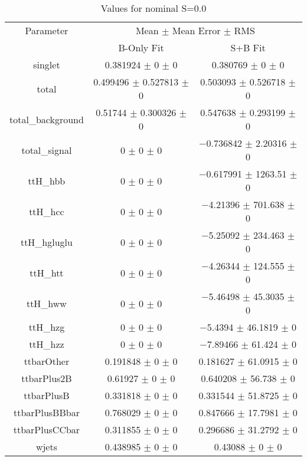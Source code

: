 \begin{table}
\centering
\caption{Values for nominal S=0.0}
\begin{tabular}{ccc}
\toprule
Parameter & \multicolumn{2}{c}{Mean $\pm$ Mean Error $\pm$ RMS}\\
 & B-Only Fit & S+B Fit\\
\midrule
singlet & \num{0.381924} $\pm$ \num{0} $\pm$ \num{0} & \num{0.380769} $\pm$ \num{0} $\pm$ \num{0}\\
total & \num{0.499496} $\pm$ \num{0.527813} $\pm$ \num{0} & \num{0.503093} $\pm$ \num{0.526718} $\pm$ \num{0}\\
total\_background & \num{0.51744} $\pm$ \num{0.300326} $\pm$ \num{0} & \num{0.547638} $\pm$ \num{0.293199} $\pm$ \num{0}\\
total\_signal & \num{0} $\pm$ \num{0} $\pm$ \num{0} & \num{-0.736842} $\pm$ \num{2.20316} $\pm$ \num{0}\\
ttH\_hbb & \num{0} $\pm$ \num{0} $\pm$ \num{0} & \num{-0.617991} $\pm$ \num{1263.51} $\pm$ \num{0}\\
ttH\_hcc & \num{0} $\pm$ \num{0} $\pm$ \num{0} & \num{-4.21396} $\pm$ \num{701.638} $\pm$ \num{0}\\
ttH\_hgluglu & \num{0} $\pm$ \num{0} $\pm$ \num{0} & \num{-5.25092} $\pm$ \num{234.463} $\pm$ \num{0}\\
ttH\_htt & \num{0} $\pm$ \num{0} $\pm$ \num{0} & \num{-4.26344} $\pm$ \num{124.555} $\pm$ \num{0}\\
ttH\_hww & \num{0} $\pm$ \num{0} $\pm$ \num{0} & \num{-5.46498} $\pm$ \num{45.3035} $\pm$ \num{0}\\
ttH\_hzg & \num{0} $\pm$ \num{0} $\pm$ \num{0} & \num{-5.4394} $\pm$ \num{46.1819} $\pm$ \num{0}\\
ttH\_hzz & \num{0} $\pm$ \num{0} $\pm$ \num{0} & \num{-7.89466} $\pm$ \num{61.424} $\pm$ \num{0}\\
ttbarOther & \num{0.191848} $\pm$ \num{0} $\pm$ \num{0} & \num{0.181627} $\pm$ \num{61.0915} $\pm$ \num{0}\\
ttbarPlus2B & \num{0.61927} $\pm$ \num{0} $\pm$ \num{0} & \num{0.640208} $\pm$ \num{56.738} $\pm$ \num{0}\\
ttbarPlusB & \num{0.331818} $\pm$ \num{0} $\pm$ \num{0} & \num{0.331544} $\pm$ \num{51.8725} $\pm$ \num{0}\\
ttbarPlusBBbar & \num{0.768029} $\pm$ \num{0} $\pm$ \num{0} & \num{0.847666} $\pm$ \num{17.7981} $\pm$ \num{0}\\
ttbarPlusCCbar & \num{0.311855} $\pm$ \num{0} $\pm$ \num{0} & \num{0.296686} $\pm$ \num{31.2792} $\pm$ \num{0}\\
wjets & \num{0.438985} $\pm$ \num{0} $\pm$ \num{0} & \num{0.43088} $\pm$ \num{0} $\pm$ \num{0}\\
\bottomrule
\end{tabular}
\end{table}